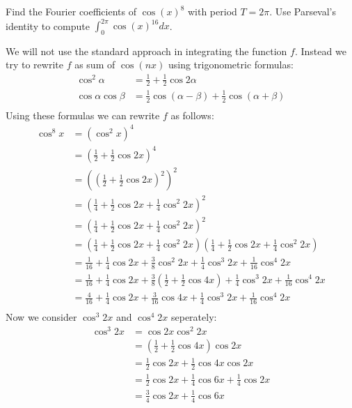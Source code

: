 \documentclass[11pt]{article}
\begin{document}
\begin{exercise}
    Find the Fourier coefficients of $\cos(x)^8$ with period $T = 2\pi$.
    Use Parseval's identity to compute $\int_0^{2\pi} \cos(x)^{16} dx$.
\end{exercise}
\begin{solution}     
We will not use the standard approach in integrating the function $f$. Instead we try to rewrite $f$ as sum of $\cos(nx)$ using trigonometric formulas:
\begin{align*}
    \cos^2\alpha &= \frac 1 2 + \frac 1 2 \cos 2 \alpha
    \\
    \cos\alpha\cos\beta &= \frac 1 2 \cos (\alpha-\beta)+ \frac 1 2 \cos (\alpha + \beta) \\
\end{align*}
Using these formulas we can rewrite $f$ as follows:
\begin{align*}
    \cos^8x &= (\cos^2x)^4\\
    &= (\frac 1 2 + \frac 1 2 \cos 2x)^4\\
    &= ((\frac 1 2 + \frac 1 2 \cos 2x)^2)^2\\
    &= (\frac 1 4 + \frac 1 2 \cos 2x + \frac 1 4 \cos ^2 2 x)^2\\
    &= (\frac 1 4 + \frac 1 2 \cos 2x + \frac 1 4 \cos ^2 2 x)^2\\
    &= (\frac 1 4 + \frac 1 2 \cos 2x + \frac 1 4 \cos ^2 2x)(\frac 1 4 + \frac 1 2 \cos 2x + \frac 1 4 \cos ^2 2x)\\
    &= \frac{1}{16}+\frac 1 4 \cos 2x + \frac 3 8 \cos^2 2x + \frac 1 4 \cos^3 2x +\frac{1}{16} \cos^4 2x\\
    &= \frac{1}{16}+\frac 1 4 \cos 2x + \frac 3 8 (\frac 1 2 + \frac 1 2 \cos 4x) + \frac 1 4 \cos^3 2x +\frac{1}{16} \cos^4 2x\\
    &= \frac{4}{16}+\frac 1 4 \cos 2x + \frac{3}{16} \cos 4x + \frac 1 4 \cos^3 2x +\frac{1}{16} \cos^4 2x\\
\end{align*}
Now we consider $\cos^3 2x$ and $\cos^4 2x$ seperately:
\begin{align*}
    \cos^3 2x &= \cos 2x \cos^2 2x\\
    &= (\frac 1 2 + \frac 1 2 \cos 4x) \cos 2x\\
    &= \frac 1 2 \cos 2x + \frac 1 2 \cos 4 x \cos 2 x \\
    &= \frac 1 2 \cos 2x + \frac 1 4 \cos 6 x  + \frac 1 4 \cos 2 x \\
    &= \frac 3 4 \cos 2x + \frac 1 4 \cos 6 x \\

\end{align*}
\end{solution}
\end{document}

